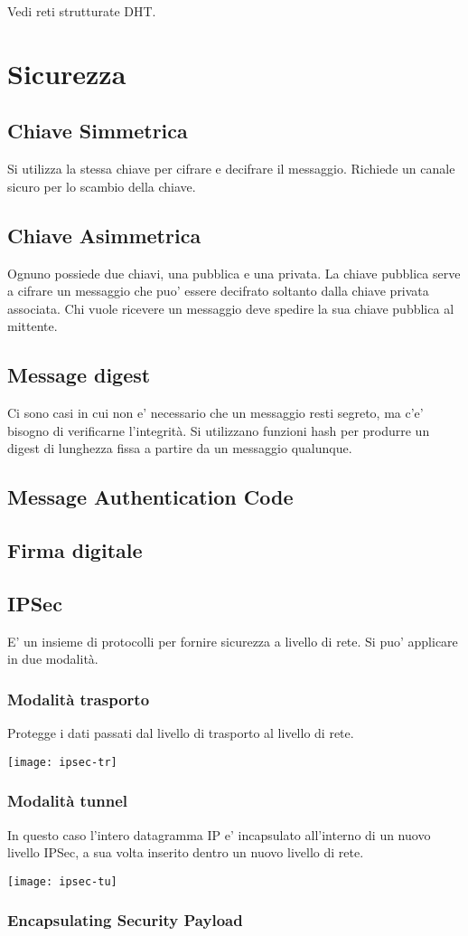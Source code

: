 Vedi reti strutturate DHT.

\chapter{Sicurezza}
\section{Chiave Simmetrica}
Si utilizza la stessa chiave per cifrare e decifrare il messaggio.
Richiede un canale sicuro per lo scambio della chiave.
\section{Chiave Asimmetrica}
Ognuno possiede due chiavi, una pubblica e una privata.
La chiave pubblica serve a cifrare un messaggio che puo' essere decifrato soltanto dalla chiave privata associata.
Chi vuole ricevere un messaggio deve spedire la sua chiave pubblica al mittente.
\section{Message digest}
Ci sono casi in cui non e' necessario che un messaggio resti segreto, ma c'e' bisogno di verificarne l'integrità. Si utilizzano funzioni hash per produrre un digest di lunghezza fissa a partire da un messaggio qualunque.
\section{Message Authentication Code}
\section{Firma digitale}
\section{IPSec}
E' un insieme di protocolli per fornire sicurezza a livello di rete.
Si puo' applicare in due modalità.
\subsection{Modalità trasporto}
Protegge i dati passati dal livello di trasporto al livello di rete.
\begin{center}
    \texttt{[image: ipsec-tr]}
\end{center}
\subsection{Modalità tunnel}
In questo caso l'intero datagramma IP e' incapsulato all'interno di un nuovo livello IPSec, a sua volta inserito dentro un nuovo livello di rete.
\begin{center}
    \texttt{[image: ipsec-tu]}
\end{center}
\subsection{Encapsulating Security Payload}
